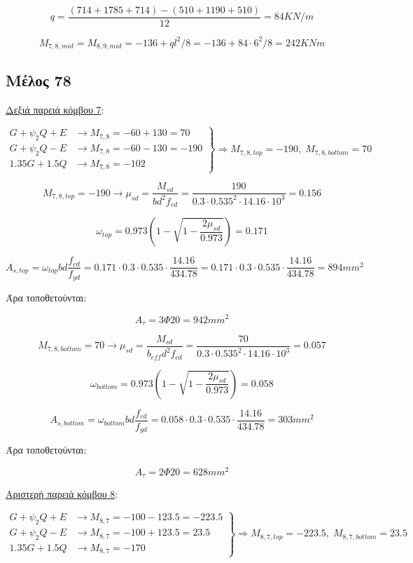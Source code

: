 \[
q = \dfrac{\left(714+1785+714\right)-\left(510+1190+510\right)}{12} = 84 KN/m
\]

\[
M_{7,8,mid} = M_{8,9,mid} = - 136 + ql^2/8 = -136 + 84\cdot6^2/8 = 242 KNm
\]

\subsection{Μέλος 78}
\noindent
\underline{Δεξιά παρειά κόμβου 7}:

\[
\left.
   \begin{array}{ll}
     G+\psi_2 Q + Ε & \rightarrow M_{7,8} = -60+130 = 70 \\
     G+\psi_2 Q - Ε & \rightarrow M_{7,8} = -60-130 = -190 \\
     1.35G + 1.5Q     & \rightarrow M_{7,8} = -102
   \end{array}
\right\} \Rightarrow M_{7,8,top} = -190,\; M_{7,8,bottom} = 70
\]

\[
M_{7,8,top} = -190 \rightarrow \mu_{sd} = \dfrac{M_{sd}}{b d^2 f_{cd}} = \dfrac{190}{0.3\cdot0.535^2\cdot14.16\cdot10^3} = 0.156
\]

\[
\omega_{top} = 0.973\left( 1 - \sqrt{1 - \dfrac{2\mu_{sd}}{0.973}} \right) = 0.171
\]

\[
A_{s,top} = \omega_{top}b d \dfrac{f_{cd}}{f_{yd}} = 0.171\cdot 0.3 \cdot 0.535 \cdot \dfrac{14.16}{434.78} = 0.171\cdot 0.3 \cdot 0.535 \cdot \dfrac{14.16}{434.78} = 894mm^2
\]

\noindent
Άρα τοποθετούνται:

\[
A_{\tau} = 3\Phi20 = 942mm^2
\]

\[
M_{7,8,bottom} = 70 \rightarrow \mu_{sd} = \dfrac{M_{sd}}{b_{eff} d^2 f_{cd}} = \dfrac{70}{0.3\cdot0.535^2\cdot14.16\cdot10^3} = 0.057
\]

\[
\omega_{bottom} = 0.973\left( 1 - \sqrt{1 - \dfrac{2\mu_{sd}}{0.973}} \right) = 0.058
\]

\[
A_{s,bottom} = \omega_{bottom}b d \dfrac{f_{cd}}{f_{yd}} = 0.058\cdot 0.3 \cdot 0.535 \cdot \dfrac{14.16}{434.78} = 303mm^2
\]

\noindent
Άρα τοποθετούνται:

\[
A_{\tau} = 2\Phi20 = 628mm^2
\]

\noindent
\underline{Αριστερή παρειά κόμβου 8}:

\[
\left.
   \begin{array}{ll}
       G+\psi_2 Q + Ε & \rightarrow M_{8,7} = -100-123.5 = -223.5 \\
       G+\psi_2 Q - Ε & \rightarrow M_{8,7} = -100+123.5 = 23.5 \\
       1.35G + 1.5Q     & \rightarrow M_{8,7} = -170
   \end{array}
\right \} \Rightarrow M_{8,7,top} = -223.5,\; M_{8,7,bottom} = 23.5
\]

